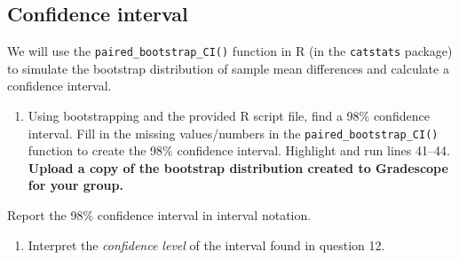 \documentclass[
]{report}
\newenvironment{Shaded}{\begin{snugshade}}{\end{snugshade}}
\newcommand{\AttributeTok}[1]{\textcolor[rgb]{0.13,0.29,0.53}{#1}}
\newcommand{\CommentTok}[1]{\textcolor[rgb]{0.56,0.35,0.01}{\textit{#1}}}
\newcommand{\DecValTok}[1]{\textcolor[rgb]{0.00,0.00,0.81}{#1}}
\newcommand{\FunctionTok}[1]{\textcolor[rgb]{0.13,0.29,0.53}{\textbf{#1}}}
\newcommand{\NormalTok}[1]{#1}
\newcommand{\SpecialCharTok}[1]{\textcolor[rgb]{0.81,0.36,0.00}{\textbf{#1}}}
\providecommand{\tightlist}{%
  \setlength{\itemsep}{0pt}\setlength{\parskip}{0pt}}
\begin{document}
\vspace{0.8in}

\subsection*{Confidence interval}\label{confidence-interval-5}

We will use the \texttt{paired\_bootstrap\_CI()} function in R (in the \texttt{catstats} package) to simulate the bootstrap distribution of sample mean differences and calculate a confidence interval.

\begin{enumerate}
\def\labelenumi{\arabic{enumi}.}
\setcounter{enumi}{12}
\tightlist
\item
  Using bootstrapping and the provided R script file, find a 98\% confidence interval. Fill in the missing values/numbers in the \texttt{paired\_bootstrap\_CI()} function to create the 98\% confidence interval. Highlight and run lines 41--44. \textbf{Upload a copy of the bootstrap distribution created to Gradescope for your group.}
\end{enumerate}

\begin{Shaded}
\end{Shaded}

Report the 98\% confidence interval in interval notation.

\vspace{0.3in}

\begin{enumerate}
\def\labelenumi{\arabic{enumi}.}
\setcounter{enumi}{13}
\tightlist
\item
  Interpret the \emph{confidence level} of the interval found in question 12.
\end{enumerate}
\end{document}
